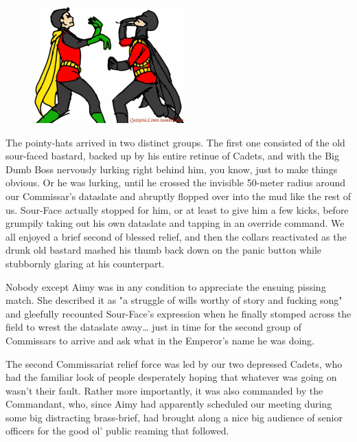 \begin{figure}
	\begin{center}
		\includegraphics[width=\figwidth]{pics/21/55.png}
	\end{center}
\end{figure}
The pointy-hats arrived in two distinct groups. 
The first one consisted of the old sour-faced bastard, backed up by his entire retinue of Cadets, and with the Big Dumb Boss nervously lurking right behind him, you know, just to make things obvious. 
 Or he was lurking, until he crossed the invisible 50-meter radius around our Commissar's dataslate and abruptly flopped over into the mud like the rest of us. 
Sour-Face actually stopped for him, or at least to give him a few kicks, before grumpily taking out his own dataslate and tapping in an override command. 
We all enjoyed a brief second of blessed relief, and then the collars reactivated as the drunk old bastard mashed his thumb back down on the panic button while stubbornly glaring at his counterpart.

Nobody except Aimy was in any condition to appreciate the ensuing pissing match. 
She described it as "a struggle of wills worthy of story and fucking song" and gleefully recounted Sour-Face's expression when he finally stomped across the field to wrest the dataslate away… just in time for the second group of Commissars to arrive and ask what in the Emperor's name he was doing. 


The second Commissariat relief force was led by our two depressed Cadets, who had the familiar look of people desperately hoping that whatever was going on wasn't their fault. 
Rather more importantly, it was also commanded by the Commandant, who, since Aimy had apparently scheduled our meeting during some big distracting brass-brief, had brought along a nice big audience of senior officers for the good ol' public reaming that followed.

